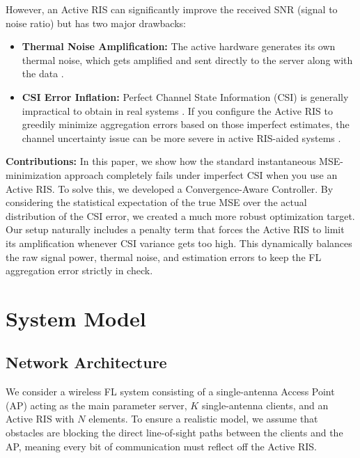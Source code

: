 \documentclass[journal, twocolumn]{IEEEtran}
\begin{document}
However, an Active RIS can significantly improve the received SNR (signal to noise ratio) but has two major drawbacks:
\begin{itemize}
    \item \textbf{Thermal Noise Amplification:} The active hardware generates its own thermal noise, which gets amplified and sent directly to the server along with the data \cite{zhi2022active}.
    \item \textbf{CSI Error Inflation:} Perfect Channel State Information (CSI) is generally impractical to obtain in real systems \cite{zhou2023channel}. If you configure the Active RIS to greedily minimize aggregation errors based on those imperfect estimates, the channel uncertainty issue can be more severe in active RIS-aided systems \cite{yang2024robust}.
\end{itemize}

\textbf{Contributions:} In this paper, we show how the standard instantaneous MSE-minimization approach completely fails under imperfect CSI when you use an Active RIS. To solve this, we developed a Convergence-Aware Controller. By considering the statistical expectation of the true MSE over the actual distribution of the CSI error, we created a much more robust optimization target. Our setup naturally includes a penalty term that forces the Active RIS to limit its amplification whenever CSI variance gets too high. This dynamically balances the raw signal power, thermal noise, and estimation errors to keep the FL aggregation error strictly in check.

\section{System Model}

\subsection{Network Architecture}
We consider a wireless FL system consisting of a single-antenna Access Point (AP) acting as the main parameter server, $K$ single-antenna clients, and an Active RIS with $N$ elements. To ensure a realistic model, we assume that obstacles are blocking the direct line-of-sight paths between the clients and the AP, meaning every bit of communication must reflect off the Active RIS.
\end{document}
